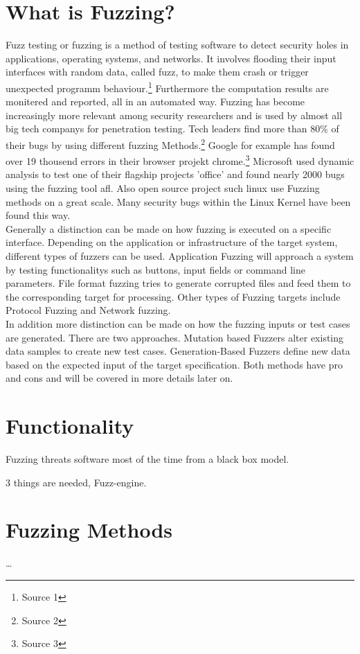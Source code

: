 \documentclass[journal=tosc,final]{iacrtrans}
\begin{document}
\section{What is Fuzzing?}
Fuzz testing or fuzzing is a method of testing software to detect security holes in applications, operating systems, and networks. It involves flooding their input interfaces with random data, called fuzz, to make them crash or trigger unexpected programm behaviour.\footnote{Source 1} Furthermore the computation results are monitered and reported, all in an automated way. Fuzzing has become increasingly more relevant among security researchers and is used by almost all big tech companys for penetration testing. Tech leaders find more than 80\% of their bugs by using different fuzzing Methods.\footnote{Source 2} Google for example  has found over 19 thousend errors in their browser projekt chrome.\footnote{Source 3} Microsoft used dynamic analysis to test one of their flagship projects 'office' and found nearly 2000 bugs using the fuzzing tool afl. Also open source project such linux use Fuzzing methods on a great scale. Many security bugs within the Linux Kernel have been found this way.\\
Generally a distinction can be made on how fuzzing is executed on a specific interface. Depending on the application or infrastructure of the target system, different types of fuzzers can be used. Application Fuzzing will approach a system by testing functionalitys such as buttons, input fields or command line parameters. File format fuzzing tries to generate corrupted files and feed them to the corresponding target for processing. Other types of Fuzzing targets include Protocol Fuzzing and Network fuzzing.\\
In addition more distinction can be made on how the fuzzing inputs or test cases are generated. There are two approaches. Mutation based Fuzzers alter existing data samples to create new test cases. Generation-Based Fuzzers define new data based on the expected input of the target specification. Both methods have pro and cons and will be covered in more details later on.
\newpage
\section{Functionality}
Fuzzing threats software most of the time from a black box model. 

3 things are needed, Fuzz-engine.
\section{Fuzzing Methods}
\dots
\end{document}
